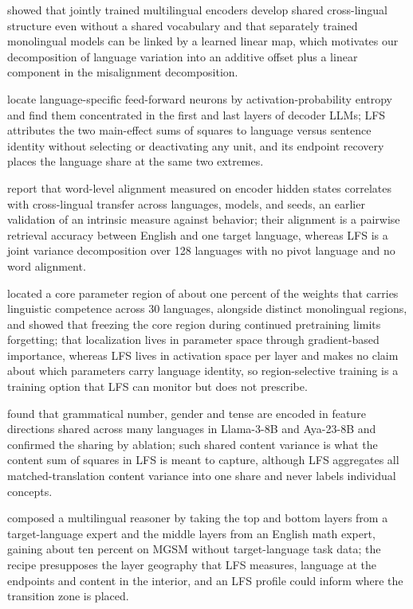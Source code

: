\documentclass{article} %
\begin{document}
\citet{conneau2020emerging} showed that jointly trained multilingual encoders develop shared cross-lingual structure even without a shared vocabulary and that separately trained monolingual models can be linked by a learned linear map, which motivates our decomposition of language variation into an additive offset plus a linear component in the misalignment decomposition.

\citet{tang2024neurons} locate language-specific feed-forward neurons by activation-probability entropy and find them concentrated in the first and last layers of decoder LLMs; LFS attributes the two main-effect sums of squares to language versus sentence identity without selecting or deactivating any unit, and its endpoint recovery places the language share at the same two extremes.

\citet{gaschi2023alignment} report that word-level alignment measured on encoder hidden states correlates with cross-lingual transfer across languages, models, and seeds, an earlier validation of an intrinsic measure against behavior; their alignment is a pairwise retrieval accuracy between English and one target language, whereas LFS is a joint variance decomposition over 128 languages with no pivot language and no word alignment.

\citet{zhang2024regions} located a core parameter region of about one percent of the weights that carries linguistic competence across 30 languages, alongside distinct monolingual regions, and showed that freezing the core region during continued pretraining limits forgetting; that localization lives in parameter space through gradient-based importance, whereas LFS lives in activation space per layer and makes no claim about which parameters carry language identity, so region-selective training is a training option that LFS can monitor but does not prescribe.

\citet{brinkmann2025grammatical} found that grammatical number, gender and tense are encoded in feature directions shared across many languages in Llama-3-8B and Aya-23-8B and confirmed the sharing by ablation; such shared content variance is what the content sum of squares in LFS is meant to capture, although LFS aggregates all matched-translation content variance into one share and never labels individual concepts.

\citet{bandarkar2025swapping} composed a multilingual reasoner by taking the top and bottom layers from a target-language expert and the middle layers from an English math expert, gaining about ten percent on MGSM without target-language task data; the recipe presupposes the layer geography that LFS measures, language at the endpoints and content in the interior, and an LFS profile could inform where the transition zone is placed.
\end{document}
